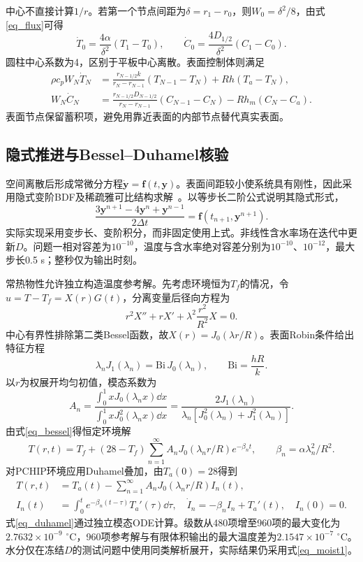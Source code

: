 中心不直接计算$1/r$。若第一个节点间距为$\delta=r_1-r_0$，则$W_0=\delta^2/8$，由式\eqref{eq_flux}可得
\[
\dot T_0=\frac{4\alpha}{\delta^2}(T_1-T_0),\qquad
\dot C_0=\frac{4D_{1/2}}{\delta^2}(C_1-C_0).
\]
圆柱中心系数为4，区别于平板中心离散。表面控制体则满足
\[
\begin{aligned}
\rho c_pW_N\dot T_N&=\frac{r_{N-1/2}k}{r_N-r_{N-1}}(T_{N-1}-T_N)+Rh(T_a-T_N),\\
W_N\dot C_N&=\frac{r_{N-1/2}D_{N-1/2}}{r_N-r_{N-1}}(C_{N-1}-C_N)-Rh_m(C_N-C_a).
\end{aligned}
\]
表面节点保留蓄积项，避免用靠近表面的内部节点替代真实表面。

\subsection{隐式推进与Bessel--Duhamel核验}
空间离散后形成常微分方程$\dot{\boldsymbol y}=\boldsymbol f(t,\boldsymbol y)$。表面间距较小使系统具有刚性，因此采用隐式变阶BDF及稀疏雅可比结构求解~\cite{bdf}。以等步长二阶公式说明其隐式形式，
\[
\frac{3\boldsymbol y^{n+1}-4\boldsymbol y^n+\boldsymbol y^{n-1}}{2\Delta t}
=\boldsymbol f(t_{n+1},\boldsymbol y^{n+1}).
\]
实际实现采用变步长、变阶积分，而非固定使用上式。非线性含水率场在迭代中更新$D$。问题一相对容差为$10^{-10}$，温度与含水率绝对容差分别为$10^{-10}$、$10^{-12}$，最大步长0.5 s；整秒仅为输出时刻。

常热物性允许独立构造温度参考解。先考虑环境恒为$T_f$的情况，令$u=T-T_f=X(r)G(t)$，分离变量后径向方程为
\[
r^2X''+rX'+\lambda^2\frac{r^2}{R^2}X=0.
\]
中心有界性排除第二类Bessel函数，故$X(r)=J_0(\lambda r/R)$。表面Robin条件给出特征方程
\begin{equation}\label{eq_bessel}
\lambda_nJ_1(\lambda_n)=\mathrm{Bi}\,J_0(\lambda_n),\qquad
\mathrm{Bi}=\frac{hR}{k}.
\end{equation}
以$r$为权展开均匀初值，模态系数为
\[
A_n=\frac{\int_0^1xJ_0(\lambda_nx)\dd x}{\int_0^1xJ_0^2(\lambda_nx)\dd x}
=\frac{2J_1(\lambda_n)}{\lambda_n[J_0^2(\lambda_n)+J_1^2(\lambda_n)]}.
\]
由式\eqref{eq_bessel}得恒定环境解
\[
T(r,t)=T_f+(28-T_f)\sum_{n=1}^{\infty}A_nJ_0(\lambda_nr/R)
e^{-\beta_nt},\qquad\beta_n=\alpha\lambda_n^2/R^2.
\]
对PCHIP环境应用Duhamel叠加，由$T_a(0)=28$得到
\begin{equation}\label{eq_duhamel}
\begin{aligned}
T(r,t)&=T_a(t)-\sum_{n=1}^{\infty}A_nJ_0(\lambda_nr/R)I_n(t),\\
I_n(t)&=\int_0^te^{-\beta_n(t-\tau)}T_a'(\tau)\dd\tau,
\quad \dot I_n=-\beta_nI_n+T_a'(t),\quad I_n(0)=0.
\end{aligned}
\end{equation}
式\eqref{eq_duhamel}通过独立模态ODE计算。级数从480项增至960项的最大变化为$2.7632\times10^{-9}$ $^\circ$C，960项参考解与有限体积输出的最大温度差为$2.1547\times10^{-7}$ $^\circ$C。水分仅在冻结$D$的测试问题中使用同类解析展开，实际结果仍采用式\eqref{eq_moist1}。

